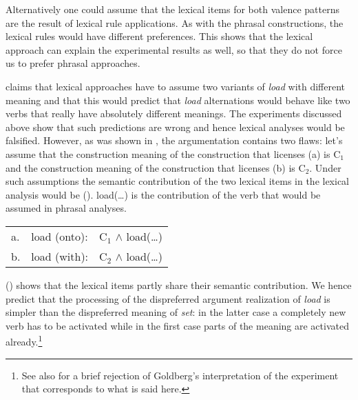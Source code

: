 \begin{exe}
\begin{xlist}[iv.]
\begin{exe}
\begin{xlist}[iv.]
Alternatively one could assume that the lexical items for both valence patterns are the result of
lexical rule applications. As with the phrasal constructions, the lexical rules would have different
preferences. This shows that the lexical approach can explain the experimental results as well, so
that they do not force us to prefer phrasal approaches.

\citet[]{Goldberg95a} claims that lexical approaches have to assume two variants of \emph{load}
with different meaning and that this would predict that \emph{load} alternations would behave like
two verbs that really have absolutely different meanings. The experiments discussed above show that
such predictions are wrong and hence lexical analyses would be falsified. However, as was shown in
, the argumentation contains two flaws: let's assume that the construction
meaning of the construction that licenses (a) is C$_1$ and the construction meaning of the
construction that licenses (b) is C$_2$. Under such assumptions the semantic contribution of
the two lexical items in the lexical analysis would be (). load(\ldots) is the contribution
of the verb that would be assumed in phrasal analyses.
\ea
\begin{tabular}[t]{@{}l@{~}l@{~}l@{}}
a. & load (onto): & C$_1$ $\wedge$ load(\ldots)\\
b. & load (with): & C$_2$ $\wedge$ load(\ldots)\\
\end{tabular}
\z
() shows that the lexical items partly share their semantic contribution. We hence predict
that the processing of the dispreferred argument realization of \emph{load} is simpler than the
dispreferred meaning of \emph{set}: in the latter case a completely new verb has to be activated
while in the first case parts of the meaning are activated already.\footnote{%
   See also  for a brief rejection of Goldberg's interpretation of the
   experiment that corresponds to what is said here.%
}


\end{xlist}
\end{exe}
\end{xlist}
\end{exe}
